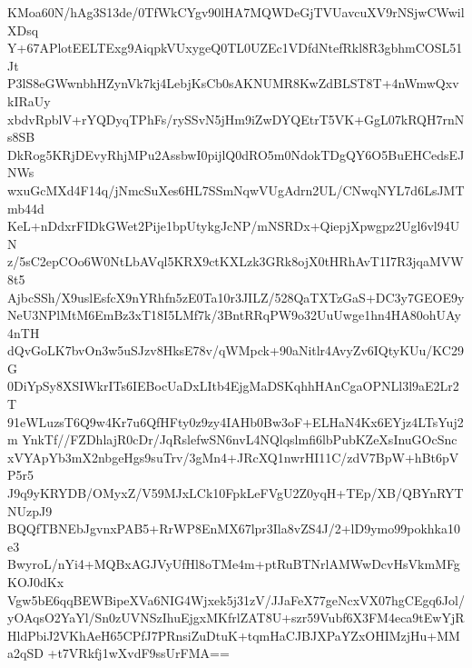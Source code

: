 KMoa60N/hAg3S13de/0TfWkCYgv90lHA7MQWDeGjTVUavcuXV9rNSjwCWwilXDsq
Y+67APlotEELTExg9AiqpkVUxygeQ0TL0UZEc1VDfdNtefRkl8R3gbhmCOSL51Jt
P3lS8eGWwnbhHZynVk7kj4LebjKsCb0sAKNUMR8KwZdBLST8T+4nWmwQxvkIRaUy
xbdvRpblV+rYQDyqTPhFs/rySSvN5jHm9iZwDYQEtrT5VK+GgL07kRQH7rnNs8SB
DkRog5KRjDEvyRhjMPu2AssbwI0pijlQ0dRO5m0NdokTDgQY6O5BuEHCedsEJNWs
wxuGcMXd4F14q/jNmcSuXes6HL7SSmNqwVUgAdrn2UL/CNwqNYL7d6LsJMTmb44d
KeL+nDdxrFIDkGWet2Pije1bpUtykgJcNP/mNSRDx+QiepjXpwgpz2Ugl6vl94UN
z/5sC2epCOo6W0NtLbAVql5KRX9ctKXLzk3GRk8ojX0tHRhAvT1I7R3jqaMVW8t5
AjbcSSh/X9uslEsfcX9nYRhfn5zE0Ta10r3JILZ/528QaTXTzGaS+DC3y7GEOE9y
NeU3NPlMtM6EmBz3xT18I5LMf7k/3BntRRqPW9o32UuUwge1hn4HA80ohUAy4nTH
dQvGoLK7bvOn3w5uSJzv8HksE78v/qWMpck+90aNitlr4AvyZv6IQtyKUu/KC29G
0DiYpSy8XSIWkrITs6IEBocUaDxLItb4EjgMaDSKqhhHAnCgaOPNLl3l9aE2Lr2T
91eWLuzsT6Q9w4Kr7u6QfHFty0z9zy4IAHb0Bw3oF+ELHaN4Kx6EYjz4LTsYuj2m
YnkTf//FZDhlajR0cDr/JqRslefwSN6nvL4NQlqslmfi6lbPubKZeXsInuGOcSnc
xVYApYb3mX2nbgeHgs9suTrv/3gMn4+JRcXQ1nwrHI11C/zdV7BpW+hBt6pVP5r5
J9q9yKRYDB/OMyxZ/V59MJxLCk10FpkLeFVgU2Z0yqH+TEp/XB/QBYnRYTNUzpJ9
BQQfTBNEbJgvnxPAB5+RrWP8EnMX67lpr3Ila8vZS4J/2+lD9ymo99pokhka10e3
BwyroL/nYi4+MQBxAGJVyUfHl8oTMe4m+ptRuBTNrlAMWwDcvHsVkmMFgKOJ0dKx
Vgw5bE6qqBEWBipeXVa6NIG4Wjxek5j31zV/JJaFeX77geNcxVX07hgCEgq6Jol/
yOAqsO2YaYl/Sn0zUVNSzIhuEjgxMKfrlZAT8U+szr59Vubf6X3FM4eca9tEwYjR
HldPbiJ2VKhAeH65CPfJ7PRnsiZuDtuK+tqmHaCJBJXPaYZxOHIMzjHu+MMa2qSD
+t7VRkfj1wXvdF9ssUrFMA==
